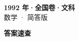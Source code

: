 \documentclass[zihao=-4, a4paper]{ctexart}
\begin{document}
\begin{center}
  {\Large\bfseries 1992 年·全国卷·文科}\\[4pt]
  {\large 数学 · 简答版}
\end{center}
\medskip
{}

\clearpage
{}
\begin{center}{\Large\bfseries 答案速查}\end{center}
\medskip

\end{document}
